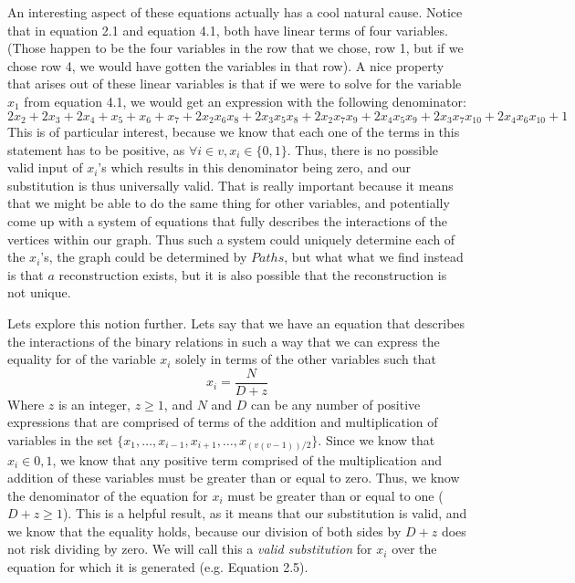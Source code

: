An interesting aspect of these equations actually has a cool natural cause.  
Notice that in equation 2.1 and equation 4.1, both have linear terms of four variables.  
(Those happen to be the four variables in the row that we chose, row 1, but if we chose row 4, we would have gotten the variables in that row). 
A nice property that arises out of these linear variables is that if we were to solve for the variable $x_1$ from equation 4.1, we would get an expression with the following denominator: 
$$2x_2 + 2x_3 + 2x_4 + x_5 + x_6 + x_7 + 2x_2x_6x_8 + 2x_3x_5x_8 + 2x_2x_7x_9 + 2x_4x_5x_9 + 2x_3x_7x_{10} + 2x_4x_6x_{10} + 1$$
This is of particular interest, because we know that each one of the terms in this statement has to be positive, as $\forall i \in v,  x_i \in \{0, 1\}$.  
Thus, there is no possible valid input of $x_i$'s which results in this denominator being zero, and our substitution is thus universally valid.  
That is really important because it means that we might be able to do the same thing for other variables, and potentially come up with a system of equations that fully describes the interactions of the vertices within our graph. 
Thus such a system could uniquely determine each of the $x_i$'s, the graph could be determined by $Paths$, but what what we find instead is that $a$ reconstruction exists, but it is also possible that the reconstruction is not unique.

Lets explore this notion further.  
Lets say that we have an equation that describes the interactions of the binary relations in such a way that we can express the equality for of the variable 
$x_i$ solely in terms of the other variables such that $$x_i = \frac{N}{D + z}$$ Where $z$ is an integer, $z \geq 1$, and $N$ and $D$ 
can be any number of positive expressions that are comprised of terms of the addition and multiplication of variables in the set 
$\{x_1, \dots,  x_{i-1},x_{i+1}, \dots, x_{(v(v-1))/2}\}$.  Since we know that $x_i \in {0,1}$, we know that any positive term comprised of the multiplication and addition of these variables must be greater than or equal to zero.  
Thus, we know the denominator of the equation for $x_i$ must be greater than or equal to one ($D + z \geq 1$). 
This is a helpful result, as it means that our substitution is valid, and we know that the equality holds, because our division of both sides by $D + z$ 
does not risk dividing by zero.  We will call this a \emph{valid substitution} for $x_i$ over the equation for which it is generated (e.g. Equation 2.5). 

